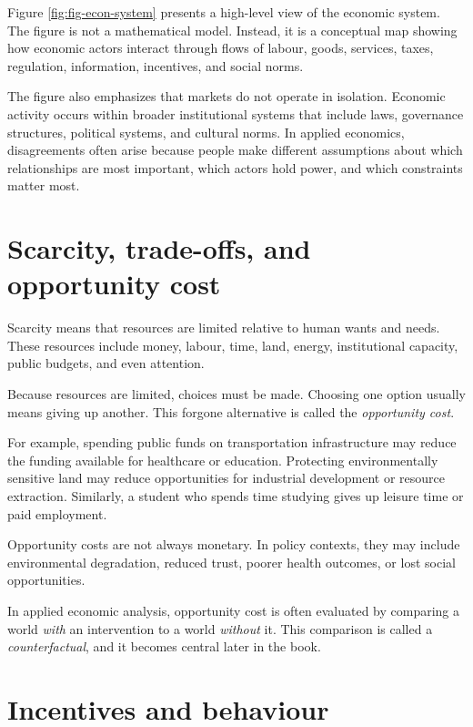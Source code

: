 \documentclass[
  11pt,
  oneside]{book}
\begin{document}
Figure \ref{fig:fig-econ-system} presents a high-level view of the economic system. The figure is not a mathematical model. Instead, it is a conceptual map showing how economic actors interact through flows of labour, goods, services, taxes, regulation, information, incentives, and social norms.

The figure also emphasizes that markets do not operate in isolation. Economic activity occurs within broader institutional systems that include laws, governance structures, political systems, and cultural norms. In applied economics, disagreements often arise because people make different assumptions about which relationships are most important, which actors hold power, and which constraints matter most.

\section{Scarcity, trade-offs, and opportunity cost}\label{scarcity-trade-offs-and-opportunity-cost}

Scarcity means that resources are limited relative to human wants and needs. These resources include money, labour, time, land, energy, institutional capacity, public budgets, and even attention.

Because resources are limited, choices must be made. Choosing one option usually means giving up another. This forgone alternative is called the \emph{opportunity cost}.

For example, spending public funds on transportation infrastructure may reduce the funding available for healthcare or education. Protecting environmentally sensitive land may reduce opportunities for industrial development or resource extraction. Similarly, a student who spends time studying gives up leisure time or paid employment.

Opportunity costs are not always monetary. In policy contexts, they may include environmental degradation, reduced trust, poorer health outcomes, or lost social opportunities.

In applied economic analysis, opportunity cost is often evaluated by comparing a world \emph{with} an intervention to a world \emph{without} it. This comparison is called a \emph{counterfactual}, and it becomes central later in the book.

\section{Incentives and behaviour}\label{incentives-and-behaviour}
\end{document}

